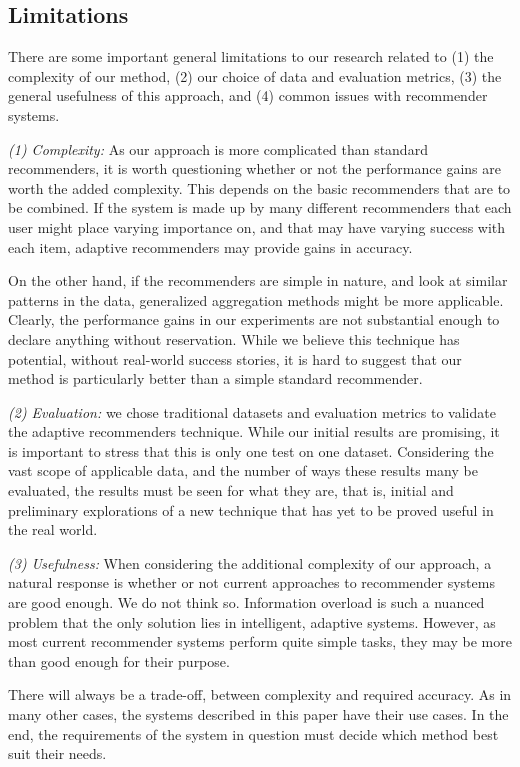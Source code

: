 \subsection{Limitations}

There are some important general limitations to our research
related to 
(1) the complexity of our method, 
(2) our choice of data and evaluation metrics, 
(3) the general usefulness of this approach, and
(4) common issues with recommender systems.

\emph{(1) Complexity:} As our approach is more complicated than standard recommenders,
it is worth questioning whether or not the performance gains are worth the added complexity.
This depends on the basic recommenders that are to be combined.
If the system is made up by many different recommenders
that each user might place varying importance on,
and that may have varying success with each item,
adaptive recommenders may provide gains in accuracy.

On the other hand, if the recommenders are simple in nature,
and look at similar patterns in the data,
generalized aggregation methods might be more applicable.
Clearly, the performance gains in our experiments
are not substantial enough to declare anything without reservation.
While we believe this technique has potential,
without real-world success stories, it is hard
to suggest that our method is particularly better
than a simple standard recommender.

\emph{(2) Evaluation:} we chose traditional datasets and evaluation metrics
to validate the adaptive recommenders technique.
While our initial results are promising, it is important to stress
that this is only one test on one dataset. Considering the vast scope
of applicable data, and the number of ways these results many be 
evaluated, the results must be seen for what they are,
that is, initial and preliminary explorations of a new technique
that has yet to be proved useful in the real world.

\emph{(3) Usefulness:}
When considering the additional complexity of our approach,
a natural response is whether or not current approaches
to recommender systems are good enough.
We do not think so. Information overload is such a nuanced problem 
that the only solution lies in intelligent, adaptive systems.
However, as most current recommender systems 
perform quite simple tasks, they may be more
than good enough for their purpose.

There will always be a trade-off, between complexity and required accuracy.
As in many other cases, the systems described in this paper
have their use cases. In the end, the requirements of the system in question
must decide which method best suit their needs.


